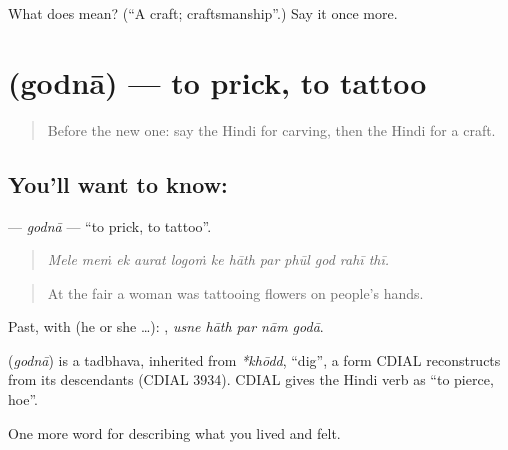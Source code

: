 \begin{tcolorbox}[breakable,colback=teal!4,colframe=teal!35!black,title={Before you move on}]
What does  mean? (\textquotedblleft{}A craft; craftsmanship\textquotedblright{}.) Say it once more.
\end{tcolorbox}
\section[\texorpdfstring{\hi{गोदना} (godnā)}{गोदना (godnā)}]{ (godnā) — to prick, to tattoo}

\label{lesson:HI-C528-godna}



\begin{quote}
Before the new one: say the Hindi for carving, then the Hindi for a craft.
\end{quote}

\subsection*{You'll want to know: }
\textbf{} — \emph{godnā} — \textquotedblleft{}to prick, to tattoo\textquotedblright{}.

\begin{quote}
           
\end{quote}

\begin{quote}
\emph{Mele meṁ ek aurat logoṁ ke hāth par phūl god rahī thī.}
\end{quote}

\begin{quote}
At the fair a woman was tattooing flowers on people's hands.
\end{quote}

Past, with  (he or she …):     , \emph{usne hāth par nām godā}.

\begin{cousinweb}
\textbf{} (\emph{godnā}) is a tadbhava, inherited from \emph{*khōdd}, \textquotedblleft{}dig\textquotedblright{}, a form CDIAL reconstructs from its descendants (CDIAL 3934). CDIAL gives the Hindi verb as \textquotedblleft{}to pierce, hoe\textquotedblright{}.
\end{cousinweb}

\begin{grammarlens}[title={What you've built}]
One more word for describing what you lived and felt.
\end{grammarlens}

